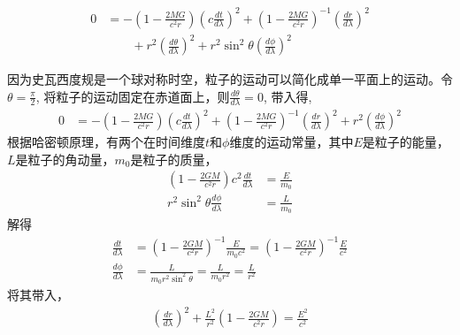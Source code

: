 \begin{equation}
    \begin{split}
        0 & =-\left(1-\frac{2MG}{c^{2}r}\right)\left(c\frac{dt}{d\lambda}\right)^{2}+\left(1-\frac{2MG}{c^{2}r}\right)^{-1}\left(\frac{dr}{d\lambda}\right)^{2}\\
        & \qquad+r^{2}\left(\frac{d\theta}{d\lambda}\right)^{2}+r^{2}\sin^{2}\theta\left(\frac{d\phi}{d\lambda}\right)^{2}
    \end{split}
\end{equation}

因为史瓦西度规是一个球对称时空，粒子的运动可以简化成单一平面上的运动。令$\theta=\frac{\pi}{2}$, 将粒子的运动固定在赤道面上，则$\frac{d\theta}{d\lambda}=0$, 带入得,
\begin{equation}
    \begin{split}
        0&=-\left(1-\frac{2MG}{c^{2}r}\right)\left(c\frac{dt}{d\lambda}\right)^{2}+\left(1-\frac{2MG}{c^{2}r}\right)^{-1}\left(\frac{dr}{d\lambda}\right)^{2}+r^{2}\left(\frac{d\phi}{d\lambda}\right)^{2}\label{eq:restrict_to_equatorial_plane}
    \end{split}
\end{equation}
根据哈密顿原理，有两个在时间维度$t$和$\phi$维度的运动常量，其中$E$是粒子的能量，$L$是粒子的角动量，$m_0$是粒子的质量，
\begin{equation}
    \begin{split}
        \left(1-\frac{2GM}{c^{2}r}\right)c^{2}\frac{dt}{d\lambda}&=\frac{E}{m_{0}}\\
        r^{2}\sin^{2}\theta\frac{d\phi}{d\lambda}&=\frac{L}{m_{0}}
    \end{split}
\end{equation}
解得
\begin{equation}
    \begin{split}
        \frac{dt}{d\lambda}&=\left(1-\frac{2GM}{c^{2}r}\right)^{-1}\frac{E}{m_{0}c^{2}}=\left(1-\frac{2GM}{c^{2}r}\right)^{-1}\frac{E}{c^{2}}\\\frac{d\phi}{d\lambda}&=\frac{L}{m_{0}r^{2}\sin^{2}\theta}=\frac{L}{m_{0}r^{2}}=\frac{L}{r^{2}}
    \end{split}
\end{equation}
将其带入，
\begin{equation}
    \begin{split}
        \left(\frac{dr}{d\lambda}\right)^{2}+\frac{L^{2}}{r^{2}}\left(1-\frac{2GM}{c^{2}r}\right)=\frac{E^{2}}{c^{2}}
    \end{split}
\end{equation}
